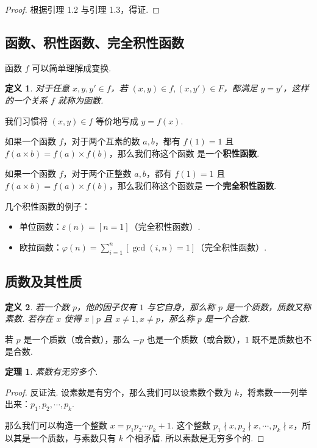 \documentclass[a4paper]{article}
\newtheorem{theorem}{定理}[section]
\newtheorem{definition}{定义}[section]
\begin{document}
\begin{proof}
    根据引理 1.2 与引理 1.3，得证.
\end{proof}

\subsection{函数、积性函数、完全积性函数}

函数 $f$ 可以简单理解成变换.

\begin{definition}
    对于任意 $x,y,y'\in f$，若 $(x,y)\in f,(x,y')\in F$，都满足 $y=y'$，这样
    的一个关系 $f$ 就称为函数.
\end{definition}

我们习惯将 $(x,y)\in f$ 等价地写成 $y=f(x)$.

如果一个函数 $f$，对于两个互素的数 $a,b$，都有 $f(1)=1$ 且 $f(a\times b) = f(a)\times f(b)$，那么我们称这个函数
是一个\textbf{积性函数}.

如果一个函数 $f$，对于两个正整数 $a,b$，都有 $f(1)=1$ 且 $f(a\times b) = f(a)\times f(b)$，那么我们称这个函数是
一个\textbf{完全积性函数}.

几个积性函数的例子：

\begin{itemize}
    \item 单位函数：$\varepsilon(n)=[n=1]$（完全积性函数）.
    \item 欧拉函数：$\varphi(n)=\sum\limits_{i=1}^n[\gcd(i,n)=1]$（完全积性函数）.
\end{itemize}

\subsection{质数及其性质}

\begin{definition}
    若一个数 $p$，他的因子仅有 $1$ 与它自身，那么称 $p$ 是一个质数，质数又称素数. 若存在 $x$ 使得 $x\mid p$ 且 $x
        \ne 1,x\ne p$，那么称 $p$ 是一个合数.
\end{definition}

若 $p$ 是一个质数（或合数），那么 $-p$ 也是一个质数（或合数），$1$ 既不是质数也不是合数.

\begin{theorem}
    素数有无穷多个.
\end{theorem}

\begin{proof}
    反证法. 设素数是有穷个，那么我们可以设素数个数为 $k$，将素数一一列举出来：$p_1,p_2,\cdots,p_k$.

    那么我们可以构造一个整数 $x=p_1p_2\cdots p_k+1$. 这个整数 $p_1\nmid x,p_2\nmid x,\cdots,p_k\nmid x$，所
    以其是一个质数，与素数只有 $k$ 个相矛盾. 所以素数是无穷多个的.
\end{proof}
\end{document}
